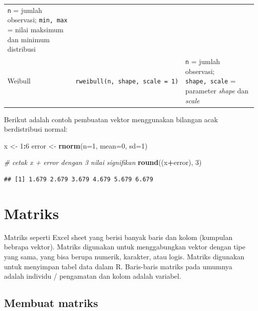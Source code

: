\documentclass[]{book}
\newenvironment{Shaded}{\begin{snugshade}}{\end{snugshade}}
\newcommand{\CommentTok}[1]{\textcolor[rgb]{0.56,0.35,0.01}{\textit{#1}}}
\newcommand{\DataTypeTok}[1]{\textcolor[rgb]{0.13,0.29,0.53}{#1}}
\newcommand{\DecValTok}[1]{\textcolor[rgb]{0.00,0.00,0.81}{#1}}
\newcommand{\KeywordTok}[1]{\textcolor[rgb]{0.13,0.29,0.53}{\textbf{#1}}}
\newcommand{\NormalTok}[1]{#1}
\newcommand{\OperatorTok}[1]{\textcolor[rgb]{0.81,0.36,0.00}{\textbf{#1}}}
\newcommand{\StringTok}[1]{\textcolor[rgb]{0.31,0.60,0.02}{#1}}
\theoremstyle{definition}
\theoremstyle{definition}
\theoremstyle{definition}
\theoremstyle{remark}
\begin{document}
\begin{longtable}[]{@{}lll@{}}
\begin{minipage}[t]{0.65\columnwidth}
\texttt{n} = jumlah observasi; \texttt{min,\ max} = nilai maksimum dan minimum distribusi\strut
\end{minipage}\tabularnewline
\begin{minipage}[t]{0.07\columnwidth}\raggedright
Weibull\strut
\end{minipage} & \begin{minipage}[t]{0.19\columnwidth}\raggedright
\texttt{rweibull(n,\ shape,\ scale\ =\ 1)}\strut
\end{minipage} & \begin{minipage}[t]{0.65\columnwidth}\raggedright
\texttt{n} = jumlah observasi; \texttt{shape,\ scale} = parameter \emph{shape} dan \emph{scale}\strut
\end{minipage}\tabularnewline
\bottomrule
\end{longtable}

Berikut adalah contoh pembuatan vektor menggunakan bilangan acak berdistribusi normal:

\begin{Shaded}
\begin{Highlighting}[]
\NormalTok{x <-}\StringTok{ }\DecValTok{1}\OperatorTok{:}\DecValTok{6}
\NormalTok{error <-}\StringTok{ }\KeywordTok{rnorm}\NormalTok{(}\DataTypeTok{n=}\DecValTok{1}\NormalTok{, }\DataTypeTok{mean=}\DecValTok{0}\NormalTok{, }\DataTypeTok{sd=}\DecValTok{1}\NormalTok{)}

\CommentTok{# cetak x + error dengan 3 nilai signifikan}
\KeywordTok{round}\NormalTok{((x}\OperatorTok{+}\NormalTok{error), }\DecValTok{3}\NormalTok{)}
\end{Highlighting}
\end{Shaded}

\begin{verbatim}
## [1] 1.679 2.679 3.679 4.679 5.679 6.679
\end{verbatim}

\hypertarget{matriks}{%
\section{Matriks}\label{matriks}}

Matriks seperti Excel sheet yang berisi banyak baris dan kolom (kumpulan bebrapa vektor). Matriks digunakan untuk menggabungkan vektor dengan tipe yang sama, yang bisa berupa numerik, karakter, atau logis. Matriks digunakan untuk menyimpan tabel data dalam R. Baris-baris matriks pada umumnya adalah individu / pengamatan dan kolom adalah variabel.

\hypertarget{creatematrix}{%
\subsection{Membuat matriks}\label{creatematrix}}
\end{document}
